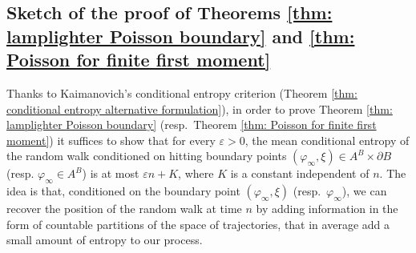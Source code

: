 \documentclass[reqno,oneside,11pt]{amsart}
\theoremstyle{plain}
\theoremstyle{definition}
\begin{document}
\subsection{Sketch of the proof of Theorems \ref{thm: lamplighter Poisson boundary} and \ref{thm: Poisson for finite first moment}}\label{subsection: sketch of the proof}
Thanks to Kaimanovich's conditional entropy criterion (Theorem  \ref{thm: conditional entropy alternative formulation}), in order to prove Theorem \ref{thm: lamplighter Poisson boundary} (resp.\ Theorem \ref{thm: Poisson for finite first moment}) it suffices to show that for every $\varepsilon>0$, the mean conditional entropy of the random walk conditioned on hitting boundary points $(\varphi_{\infty},\xi)\in A^B\times \partial B$ (resp. $\varphi_{\infty}\in A^B$) is at most $\varepsilon n+K$, where $K$ is a constant independent of $n$. The idea is that, conditioned on the boundary point $(\varphi_{\infty},\xi)$ (resp.\ $\varphi_{\infty}$), we can recover the position of the random walk at time $n$ by adding information in the form of countable partitions of the space of trajectories, that in average add a small amount of entropy to our process. 
\end{document}
